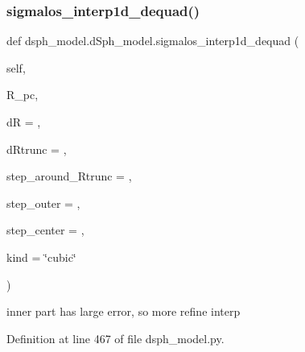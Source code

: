 \subsubsection{\texorpdfstring{sigmalos\+\_\+interp1d\+\_\+dequad()}{sigmalos\_interp1d\_dequad()}}
{\footnotesize\ttfamily def dsph\+\_\+model.\+d\+Sph\+\_\+model.\+sigmalos\+\_\+interp1d\+\_\+dequad (\begin{DoxyParamCaption}\item[{}]{self,  }\item[{}]{R\+\_\+pc,  }\item[{}]{dR = {},  }\item[{}]{d\+Rtrunc = {},  }\item[{}]{step\+\_\+around\+\_\+\+Rtrunc = {},  }\item[{}]{step\+\_\+outer = {},  }\item[{}]{step\+\_\+center = {},  }\item[{}]{kind = {\ttfamily \char`\"{}cubic\char`\"{}} }\end{DoxyParamCaption})}

\begin{DoxyVerb}inner part has large error, so more refine interp
\end{DoxyVerb}
 

Definition at line 467 of file dsph\+\_\+model.\+py.


